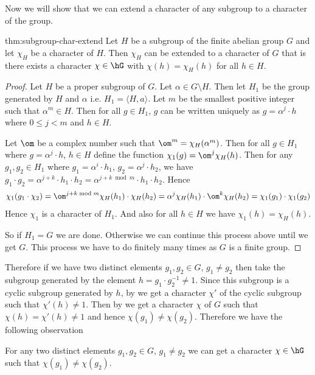 Now we will show that we can extend a character of any subgroup to a character of the group. 
\begin{Theorem}{}{thm:subgroup-char-extend}
  Let $H$ be a subgroup of the finite abelian group $G$ and let $\chi_H$ be a character of $H$. Then $\chi_H$ can be extended to a character of $G$ that is there exists a character $\chi\in\hG$ with $\chi(h)=\chi_H(h)$ for all $h\in H$. 
\end{Theorem}
\begin{proof}
  Let $H$ be a proper subgroup of $G$. Let $\alpha\in G\setminus H$. Then let $H_1$ be the group generated by $H$ and $\alpha$ i.e. $H_1=\langle H,a\rangle$. Let $m$ be the smallest positive integer such that $\alpha^m\in H$. Then for all $g\in H_1$, $g$ can be written uniquely as $g=\alpha^j\cdot h$ where $0\leq j<m$ and $h\in H$. 

  Let $\om$ be a complex number such that $\om^m=\chi_H(\alpha^m)$. Then for all $g\in H_1$ where $g=\alpha^j\cdot h$, $h\in H$ define the function $\chi_1(g)=\om^j \chi_H(h)$. Then for any $g_1,g_2\in H_1$ where $g_1=\alpha^i\cdot h_1$, $g_2=\alpha^j\cdot h_2$, we have $g_1\cdot g_2=\alpha^{j+k}\cdot h_1\cdot h_2=\alpha^{j+k\bmod{m}}\cdot h_1\cdot h_2$. Hence $$\chi_1(g_1\cdot \chi_2)=\om^{j+k \bmod{m}}\chi_H(h_1)\cdot \chi_H(h_2)=\alpha^j\chi_H(h_1)\cdot \om^k\chi_H(h_2)=\chi_1(g_1)\cdot \chi_1(g_2)$$Hence $\chi_1$ is a character of $H_1$. And also for all $h\in H$ we have $\chi_1(h)=\chi_H(h)$. 
  
  So if $H_1=G$ we are done. Otherwise we can continue this process above until we get $G$. This process we have to do finitely many times as $G$ is a finite group.
\end{proof}


Therefore if we have two distinct elements $g_1,g_2\in G$, $g_1\neq g_2$ then take the subgroup generated by the element $h=g_1\cdot g_2^{-1}\neq 1$. Since this subgroup is a cyclic subgroup generated by $h$, by  we get a character $\chi'$ of the cyclic subgroup such that $\chi'(h)\neq 1$. Then by  we get a character $\chi$ of $G$ such that $\chi(h)=\chi'(h)\neq 1$ and hence $\chi(g_1)\neq \chi(g_2)$. Therefore we have the following observation
\begin{observation}
For any two distinct elements $g_1,g_2\in G$, $g_1\neq g_2$ we can get a character $\chi\in\hG$ such that $\chi(g_1)\neq \chi(g_2)$. 
\end{observation} 

